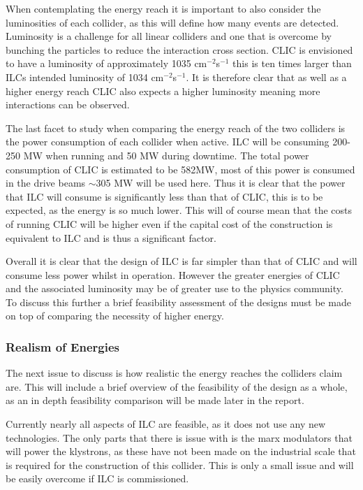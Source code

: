 When contemplating the energy reach it is important to also consider the luminosities of each collider, as this will define how many events are detected. Luminosity is a challenge for all linear colliders and one that is overcome by bunching the particles to reduce the interaction cross section. CLIC is envisioned to have a luminosity of approximately 1035 cm$^{-2}$s$^{−1}$\cite{CLIC:Luminosity} this is ten times larger than ILCs intended luminosity of 1034 cm$^{-2}$s$^{−1}$\cite{IOP:ILC}. It is therefore clear that as well as a higher energy reach CLIC also expects a higher luminosity meaning more interactions can be observed.

The last facet to study when comparing the energy reach of the two colliders is the power consumption of each collider when active. ILC will be consuming 200-250 MW when running and 50 MW during downtime\cite{ILC:Director}. The total power consumption of CLIC is estimated to be 582MW\cite{CLIC:Power}, most of this power is consumed in the drive beams $\sim$305 MW will be used here. Thus it is clear that the power that ILC will consume is significantly less than that of CLIC, this is to be expected, as the energy is so much lower. This will of course mean that the costs of running CLIC will be higher even if the capital cost of the construction is equivalent to ILC and is thus a significant factor.

Overall it is clear that the design of ILC is far simpler than that of CLIC and will consume less power whilst in operation. However the greater energies of CLIC and the associated luminosity may be of greater use to the physics community. To discuss this further a brief feasibility assessment of the designs must be made on top of comparing the necessity of higher energy.

\subsubsection{Realism of Energies}
The next issue to discuss is how realistic the energy reaches the colliders claim are. This will include a brief overview of the feasibility of the design as a whole, as an in depth feasibility comparison will be made later in the report.

Currently nearly all aspects of ILC are feasible, as it does not use any new technologies. The only parts that there is issue with is the marx modulators that will power the klystrons, as these have not been made on the industrial scale that is required for the construction of this collider\cite{ILC:ReferenceDesignReport}. This is only a small issue and will be easily overcome if ILC is commissioned.

